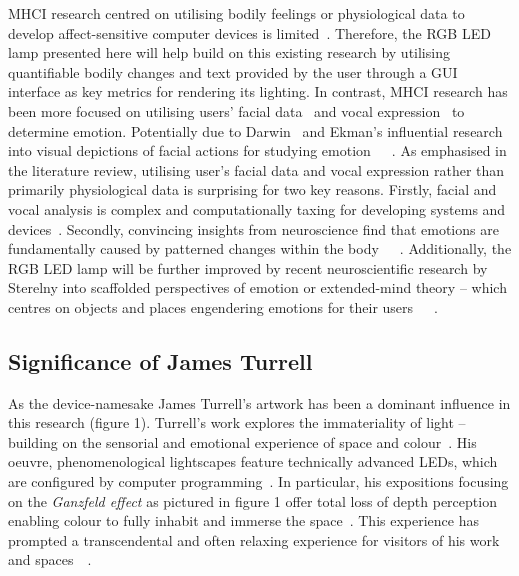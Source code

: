 \documentclass{sigchi}
\begin{document}
MHCI research centred on utilising bodily feelings or physiological data to develop affect-sensitive computer devices is limited~\cite{pantic2008human}. Therefore, the RGB LED lamp presented here will help build on this existing research by utilising quantifiable bodily changes and text provided by the user through a GUI interface as key metrics for rendering its lighting. In contrast, MHCI research has been more focused on utilising users’ facial data~\cite{yang2015lighting} and vocal expression~\cite{davletcharova2015detection} to determine emotion. Potentially due to Darwin~\cite{hess2009darwin} and Ekman’s influential research into visual depictions of facial actions for studying emotion~\cite{ekman1992facial}~\cite{ekman2003darwin}~\cite{ekman2006darwin}. As emphasised in the literature review, utilising user’s facial data and vocal expression rather than primarily physiological data is surprising for two key reasons. Firstly, facial and vocal analysis is complex and computationally taxing for developing systems and devices~\cite{marechal2019survey}. Secondly, convincing insights from neuroscience find that emotions are fundamentally caused by patterned changes within the body~\cite{colombetti2014feeling}~\cite{james1922emotions}~\cite{laricchiuta2015embodied}. Additionally, the RGB LED lamp will be further improved by recent neuroscientific research by Sterelny into scaffolded perspectives of emotion or extended-mind theory – which centres on objects and places engendering emotions for their users~\cite{colombetti2015scaffoldings}~\cite{sterelny2010minds}~\cite{sterelny2004externalism}.


\subsection{Significance of James Turrell}

As the device-namesake James Turrell’s artwork has been a dominant influence in this research (figure 1). Turrell’s work explores the immateriality of light – building on the sensorial and emotional experience of space and colour~\cite{adcock1990james}. His oeuvre, phenomenological lightscapes feature technically advanced LEDs, which are configured by computer programming~\cite{hylton2013james}. In particular, his expositions focusing on the \textit{Ganzfeld effect} as pictured in figure 1 offer total loss of depth perception enabling colour to fully inhabit and immerse the space~\cite{basse2016light}. This experience has prompted a transcendental and often relaxing experience for visitors of his work and spaces~\cite{adcock1990james}~\cite{basse2016light}.
\end{document}
